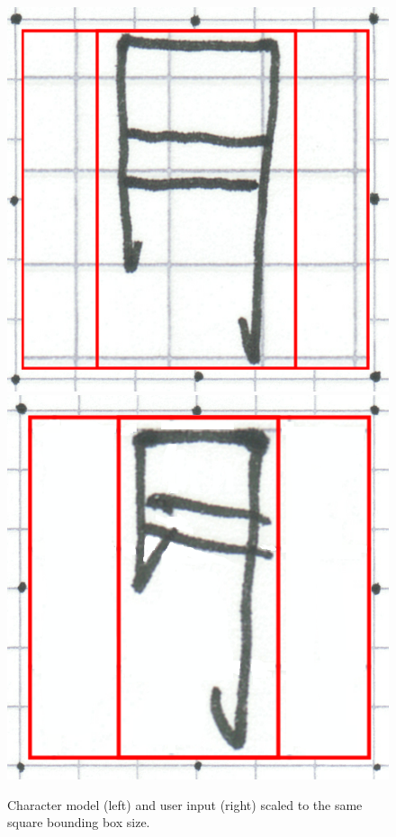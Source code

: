 \begin{figure}[htbp]
  \begin{center}
    \includegraphics[scale=0.2]{images/characterModelScaled.png}
    \includegraphics[scale=0.2]{images/input4WithScaledBoundingBox.png}
    \caption{Character model (left) and user input (right) scaled to the same square bounding box size.}
    \label{fig:inputscaledboundingbox}
  \end{center}
\end{figure}

